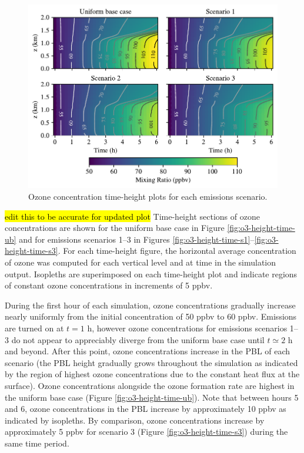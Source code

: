 \begin{figure}[t]
  \centering
    \includegraphics[width=\textwidth]{figures/chapter4/height-time-o3-four-scenarios.pdf}
    \caption{Ozone concentration time-height plots for each emissions scenario.}
    \label{fig:ht-o3}
\end{figure}

\hl{edit this to be accurate for updated plot} Time-height sections of ozone concentrations are shown for the uniform base case in Figure \ref{fig:o3-height-time-ub} and for emissions scenarios 1--3 in Figures \ref{fig:o3-height-time-s1}--\ref{fig:o3-height-time-s3}. For each time-height figure, the horizontal average concentration of ozone was computed for each vertical level and at time in the simulation output. Isopleths are superimposed on each time-height plot and indicate regions of constant ozone concentrations in increments of 5 ppbv. 

During the first hour of each simulation, ozone concentrations gradually increase nearly uniformly from the initial concentration of 50 ppbv to 60 ppbv. Emissions are turned on at $t=1$ h, however ozone concentrations for emissions scenarios 1--3 do not appear to appreciably diverge from the uniform base case until $t\simeq2$ h and beyond. After this point, ozone concentrations increase in the PBL of each scenario (the PBL height gradually grows throughout the simulation as indicated by the region of highest ozone concentrations due to the constant heat flux at the surface). Ozone concentrations alongside the ozone formation rate are highest in the uniform base case (Figure \ref{fig:o3-height-time-ub}). Note that between hours 5 and 6, ozone concentrations in the PBL increase by approximately 10 ppbv as indicated by isopleths. By comparison, ozone concentrations increase by approximately 5 ppbv for scenario 3 (Figure \ref{fig:o3-height-time-s3}) during the same time period.


